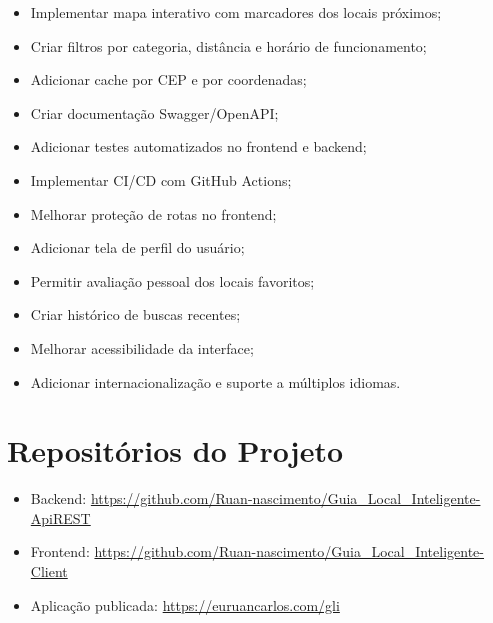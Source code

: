 \documentclass[
    12pt,
    oneside,
    openright,
    a4paper,
    english,
    brazil
]{abntex2}
\begin{document}
\begin{itemize}
    \item Implementar mapa interativo com marcadores dos locais próximos;
    \item Criar filtros por categoria, distância e horário de funcionamento;
    \item Adicionar cache por CEP e por coordenadas;
    \item Criar documentação Swagger/OpenAPI;
    \item Adicionar testes automatizados no frontend e backend;
    \item Implementar CI/CD com GitHub Actions;
    \item Melhorar proteção de rotas no frontend;
    \item Adicionar tela de perfil do usuário;
    \item Permitir avaliação pessoal dos locais favoritos;
    \item Criar histórico de buscas recentes;
    \item Melhorar acessibilidade da interface;
    \item Adicionar internacionalização e suporte a múltiplos idiomas.
\end{itemize}


\chapter{Repositórios do Projeto}

\begin{itemize}
    \item Backend: \url{https://github.com/Ruan-nascimento/Guia_Local_Inteligente-ApiREST}
    \item Frontend: \url{https://github.com/Ruan-nascimento/Guia_Local_Inteligente-Client}
    \item Aplicação publicada: \url{https://euruancarlos.com/gli}
\end{itemize}

\end{document}
